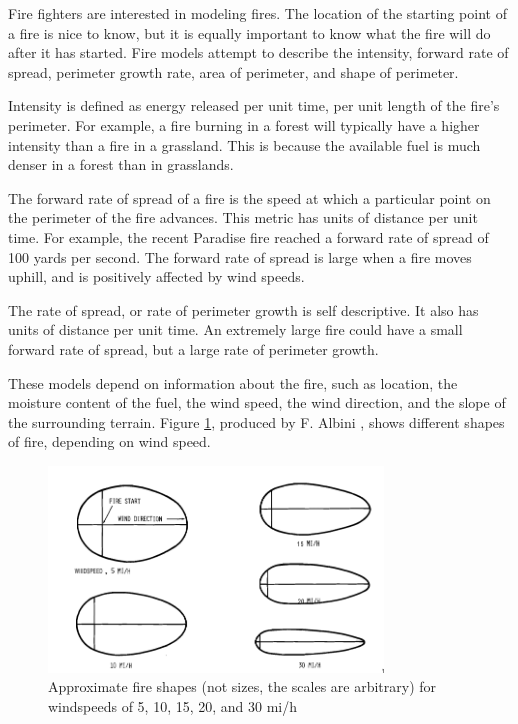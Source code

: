 \documentclass[12pt,journal,compsoc]{IEEEtran}
\begin{document}
Fire fighters are interested in modeling fires. The location of the starting point of a fire is nice to know, but it is equally important to know what the fire will do after it has started. Fire models attempt to describe the intensity, forward rate of spread, perimeter growth rate, area of perimeter, and shape of perimeter. 

Intensity is defined as energy released per unit time, per unit length of the fire’s perimeter. For example, a fire burning in a forest will typically have a higher intensity than a fire in a grassland. This is because the available fuel is much denser in a forest than in grasslands.

The forward rate of spread of a fire is the speed at which a particular point on the perimeter of the fire advances. This metric has units of distance per unit time. For example, the recent Paradise fire reached a forward rate of spread of 100 yards per second. The forward rate of spread is large when a fire moves uphill, and is positively affected by wind speeds.

The rate of spread, or rate of perimeter growth is self descriptive. It also has units of distance per unit time. An extremely large fire could have a small forward rate of spread, but a large rate of perimeter growth.

These models depend on information about the fire, such as location, the moisture content of the fuel, the wind speed, the wind direction, and the slope of the surrounding terrain. Figure \ref{fire_shape}, produced by F. Albini \cite{estimating_wildfire}, shows different shapes of fire, depending on wind speed.

\begin{figure}[h!]
\hspace*{0cm}
\centering
\includegraphics[width=3.5in]{fire_shape.png}
\caption{Approximate fire shapes (not sizes, the scales are arbitrary) for windspeeds of 5, 10, 15, 20, and 30 mi/h \cite{estimating_wildfire}}
\label{fire_shape}
\end{figure}
\end{document}
